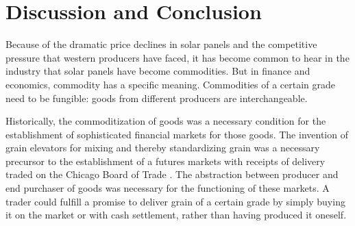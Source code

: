 \documentclass[a4paper]{article}
\begin{document}

\section{Discussion and Conclusion}

Because of the dramatic price declines in solar panels and the competitive pressure that western producers have faced, it has become common to hear in the industry that solar panels have become commodities. But in finance and economics, commodity has a specific meaning. Commodities of a certain grade need to be fungible: goods from different producers are interchangeable.

Historically, the commoditization of goods was a necessary condition for the establishment of sophisticated financial markets for those goods. The invention of grain elevators for mixing and thereby standardizing grain was a necessary precursor to the establishment of a futures markets with receipts of delivery traded on the Chicago Board of Trade \citep{cronon_natures_1992}. The abstraction between producer and end purchaser of goods was necessary for the functioning of these markets. A trader could fulfill a promise to deliver grain of a certain grade by simply buying it on the market or with cash settlement, rather than having produced it oneself.
\end{document}
